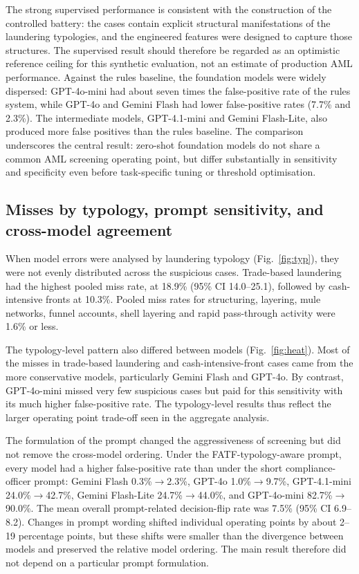 \documentclass[pdflatex,sn-basic,Numbered]{sn-jnl}
\begin{document}
The strong supervised performance is consistent with the construction of the controlled battery: the cases contain explicit structural manifestations of the laundering typologies, and the engineered features were designed to capture those structures. The supervised result should therefore be regarded as an optimistic reference ceiling for this synthetic evaluation, not an estimate of production AML performance. Against the rules baseline, the foundation models were widely dispersed: GPT-4o-mini had about seven times the false-positive rate of the rules system, while GPT-4o and Gemini Flash had lower false-positive rates (7.7\% and 2.3\%). The intermediate models, GPT-4.1-mini and Gemini Flash-Lite, also produced more false positives than the rules baseline. The comparison underscores the central result: zero-shot foundation models do not share a common AML screening operating point, but differ substantially in sensitivity and specificity even before task-specific tuning or threshold optimisation.

\subsection{Misses by typology, prompt sensitivity, and cross-model agreement}\label{sec:typology}

When model errors were analysed by laundering typology (Fig.~\ref{fig:typ}), they were not evenly distributed across the suspicious cases. Trade-based laundering had the highest pooled miss rate, at 18.9\% (95\% CI 14.0--25.1), followed by cash-intensive fronts at 10.3\%. Pooled miss rates for structuring, layering, mule networks, funnel accounts, shell layering and rapid pass-through activity were 1.6\% or less.

The typology-level pattern also differed between models (Fig.~\ref{fig:heat}). Most of the misses in trade-based laundering and cash-intensive-front cases came from the more conservative models, particularly Gemini Flash and GPT-4o. By contrast, GPT-4o-mini missed very few suspicious cases but paid for this sensitivity with its much higher false-positive rate. The typology-level results thus reflect the larger operating point trade-off seen in the aggregate analysis.

The formulation of the prompt changed the aggressiveness of screening but did not remove the cross-model ordering. Under the FATF-typology-aware prompt, every model had a higher false-positive rate than under the short compliance-officer prompt: Gemini Flash 0.3\%$\rightarrow$2.3\%, GPT-4o 1.0\%$\rightarrow$9.7\%, GPT-4.1-mini 24.0\%$\rightarrow$42.7\%, Gemini Flash-Lite 24.7\%$\rightarrow$44.0\%, and GPT-4o-mini 82.7\%$\rightarrow$90.0\%. The mean overall prompt-related decision-flip rate was 7.5\% (95\% CI 6.9--8.2). Changes in prompt wording shifted individual operating points by about 2--19 percentage points, but these shifts were smaller than the divergence between models and preserved the relative model ordering. The main result therefore did not depend on a particular prompt formulation.
\end{document}
